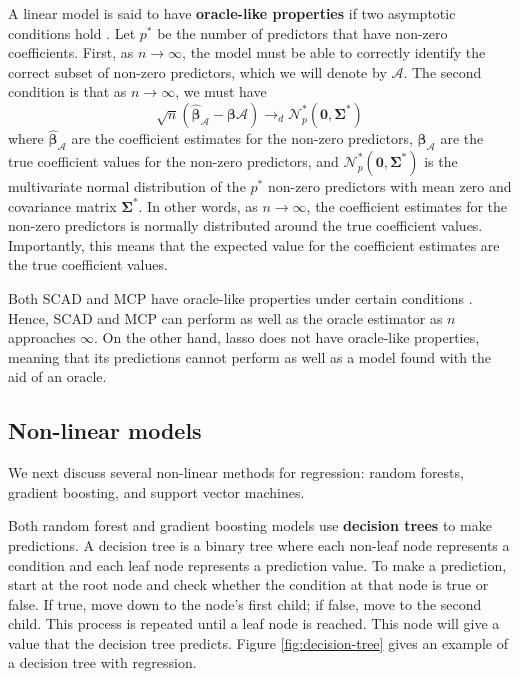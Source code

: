 \documentclass{article}
\begin{document}
A linear model is said to have \textbf{oracle-like properties} if two asymptotic conditions hold \cite{zou2006adaptive}. Let $p^\ast$ be the number of predictors that have non-zero coefficients. First, as $n\to \infty$, the model must be able to correctly identify the correct subset of non-zero predictors, which we will denote by $\mathcal{A}$. The second condition is that as $n\to\infty$, we must have
\begin{equation}
	\sqrt{n}(\hat{\bm{\beta}}_\mathcal{A} - \bm{\beta}\mathcal{A})\to_d \mathcal{N}_p^{\ast}(\mathbf{0}, \mathbf{\Sigma}^\ast)
\end{equation}
where $\hat{\bm{\beta}}_\mathcal{A}$ are the coefficient estimates for the non-zero predictors, $\bm{\beta}_\mathcal{A}$ are the true coefficient values for the non-zero predictors, and $\mathcal{N}_p^\ast(\mathbf{0}, \mathbf{\Sigma}^\ast)$ is the multivariate normal distribution of the $p^\ast$ non-zero predictors with mean zero and covariance matrix $\mathbf{\Sigma}^\ast$. In other words, as $n\to\infty$, the coefficient estimates for the non-zero predictors is normally distributed around the true coefficient values. Importantly, this means that the expected value for the coefficient estimates are the true coefficient values.

Both SCAD and MCP have oracle-like properties under certain conditions \cite{fan2001variable, zhang2010nearly}. Hence, SCAD and MCP can perform as well as the oracle estimator as $n$ approaches $\infty$. On the other hand, lasso does not have oracle-like properties, meaning that its predictions cannot perform as well as a model found with the aid of an oracle.

\subsection{Non-linear models}
We next discuss several non-linear methods for regression: random forests, gradient boosting, and support vector machines.

Both random forest and gradient boosting models use \textbf{decision trees} to make predictions. A decision tree is a binary tree where each non-leaf node represents a condition and each leaf node represents a prediction value. To make a prediction, start at the root node and check whether the condition at that node is true or false. If true, move down to the node's first child; if false, move to the second child. This process is repeated until a leaf node is reached. This node will give a value that the decision tree predicts. Figure \ref{fig:decision-tree} gives an example of a decision tree with regression.
\end{document}
